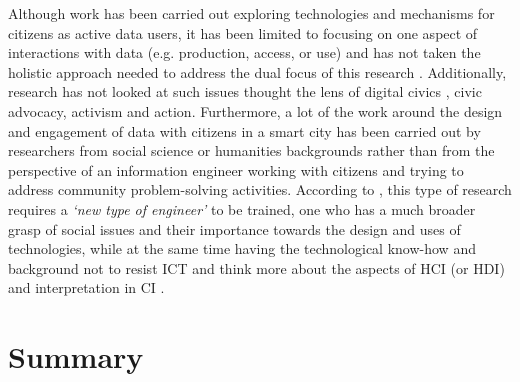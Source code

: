 \noindent
Although work has been carried out exploring technologies and mechanisms for citizens as active data users, it has been limited to focusing on one aspect of interactions with data (e.g. production, access, or use) and has not taken the holistic approach needed \citep[ch. 2]{clement_connecting_2012} to address the dual focus of this research \citep{stillman_community_2009}. Additionally, research has not looked at such issues thought the lens of digital civics \citep{olivier_digital_2015}, civic advocacy, activism and action. Furthermore, a lot of the work around the design and engagement of data with citizens in a smart city has been carried out by researchers from social science or humanities backgrounds rather than from the perspective of an information engineer working with citizens and trying to address community problem-solving activities. According to \citet{bradley_social_2006}, this type of research requires a \textit{`new type of engineer'} to be trained, one who has a much broader grasp of social issues and their importance towards the design and uses of technologies, while at the same time having the technological know-how and background not to resist ICT and think more about the aspects of HCI (or HDI) and interpretation in CI \citep{stillman_community_2009}.

\section{Summary}
\label{literature-summary}


